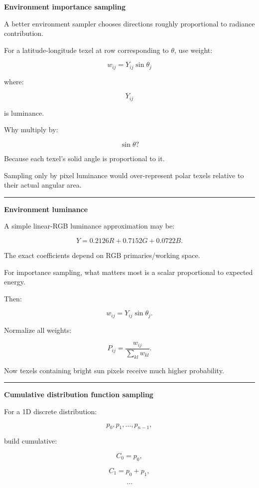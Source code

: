 \textbf{Environment importance sampling}

A better environment sampler chooses directions roughly proportional to radiance contribution.

For a latitude-longitude texel at row corresponding to \(\theta\), use weight:

\[
\boxed{
w_{ij}
=
Y_{ij}
\sin\theta_j
}
\]

where:

\[
Y_{ij}
\]

is luminance.

Why multiply by:

\[
\sin\theta?
\]

Because each texel's solid angle is proportional to it.

Sampling only by pixel luminance would over-represent polar texels relative to their actual angular area.

\begin{center}\rule{0.5\linewidth}{0.5pt}\end{center}

\textbf{Environment luminance}

A simple linear-RGB luminance approximation may be:

\[
Y
=
0.2126R+
0.7152G+
0.0722B.
\]

The exact coefficients depend on RGB primaries/working space.

For importance sampling, what matters most is a scalar proportional to expected energy.

Then:

\[
w_{ij}
=
Y_{ij}\sin\theta_j.
\]

Normalize all weights:

\[
P_{ij}
=
\frac{
w_{ij}
}{
\sum_{kl}w_{kl}
}.
\]

Now texels containing bright sun pixels receive much higher probability.

\begin{center}\rule{0.5\linewidth}{0.5pt}\end{center}

\textbf{Cumulative distribution function sampling}

For a 1D discrete distribution:

\[
p_0,p_1,\dots,p_{n-1},
\]

build cumulative:

\[
C_0=p_0,
\]

\[
C_1=p_0+p_1,
\]

\[
\dots
\]


